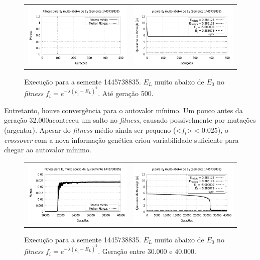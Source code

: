 	\begin{figure}[htbp]
	\centering
  \begin{tabular}{@{}cc@{}}	
		\includegraphics[width=.45\textwidth]{figs/resultados/variandoELSemente/T4_S-1445738835_fitness.pdf} &
    \includegraphics[width=.45\textwidth]{figs/resultados/variandoELSemente/T4_S-1445738835_rho.pdf}
  \end{tabular}
  \caption{Execução para a semente 1445738835. $E_L$ muito abaixo de $E_0$ no \textit{fitness} $f_i = e^{-\lambda(\rho_i - E_L)^2}$. Até geração 500.}
	\label{fig:execucoesSemente_EL_umMuitoAbaixo500}
	\end{figure}
	
	Entretanto, houve convergência para o autovalor mínimo. Um pouco antes da geração 32.000aconteceu um salto no \emph{fitness}, causado possivelmente por mutações (argentar). Apesar do \emph{fitness} médio ainda ser pequeno (<$f_i$>$< 0.025$), o \emph{crossover} com a nova informação genética criou variabilidade suficiente para chegar ao autovalor mínimo.
	
	\begin{figure}[htbp]
	\centering
  \begin{tabular}{@{}cc@{}}	
		\includegraphics[width=.45\textwidth]{figs/resultados/variandoELSemente/T4_S-1445738835_fitness-extendido.pdf} &
    \includegraphics[width=.45\textwidth]{figs/resultados/variandoELSemente/T4_S-1445738835_rho_extendido.pdf}
  \end{tabular}
  \caption{Execução para a semente 1445738835. $E_L$ muito abaixo de $E_0$ no \textit{fitness} $f_i = e^{-\lambda(\rho_i - E_L)^2}$. Geração entre 30.000 e 40.000.}
	\label{fig:execucoesSemente_EL_umMuitoAbaixo40000}
	\end{figure}
	

